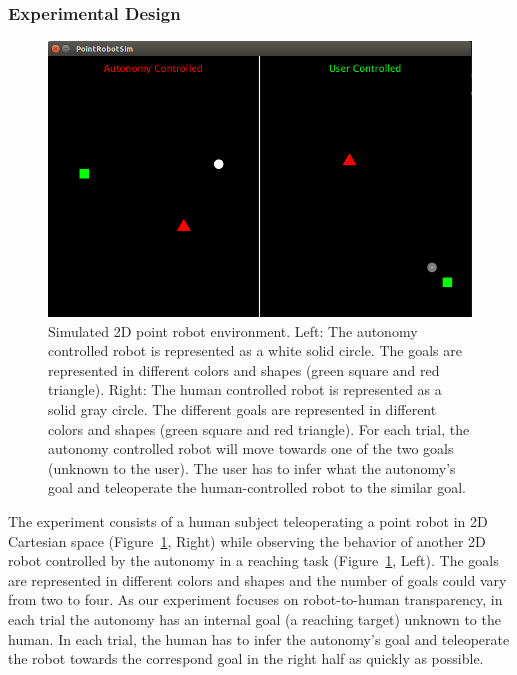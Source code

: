 \documentclass[12pt]{article}
\begin{document}
\subsubsection{Experimental Design}
\begin{figure}[t!]
	\includegraphics[keepaspectratio, width = 1\textwidth, center]{./figures/samplePic.png}
	\caption{Simulated 2D point robot environment. Left: The autonomy controlled robot is represented as a white solid circle. The goals are represented in different colors and shapes (green square and red triangle). Right: The human controlled robot is represented as a solid gray circle. The different goals are represented in different colors and shapes (green square and red triangle). For each trial, the autonomy controlled robot will move towards one of the two goals (unknown to the user). The user has to infer what the autonomy's goal and teleoperate the human-controlled robot to the similar goal. }
	\label{fig:2d_exp}
\end{figure}
The experiment consists of a human subject teleoperating a point robot in 2D Cartesian space (Figure~\ref{fig:2d_exp}, Right) while observing the behavior of another 2D robot controlled by the autonomy in a reaching task (Figure~\ref{fig:2d_exp}, Left). The goals are represented in different colors and shapes and the number of goals could vary from two to four.
As our experiment focuses on robot-to-human transparency, in each trial the autonomy has an internal goal (a reaching target) unknown to the human. In each trial, the human has to infer the autonomy's goal and teleoperate the robot towards the correspond goal in the right half as quickly as possible. 
\end{document}
